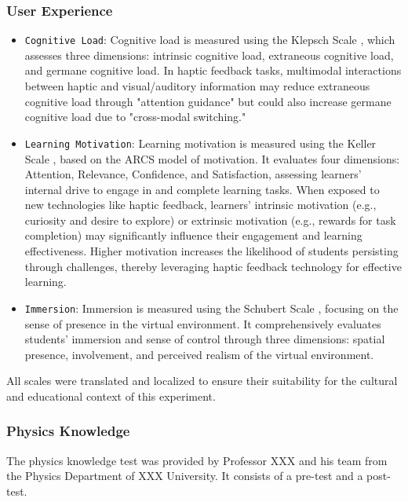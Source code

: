\documentclass[runningheads]{llncs}
\begin{document}
\subsubsection{User Experience}
\begin{itemize}
  \item {\texttt{Cognitive Load}}: Cognitive load is measured using the Klepsch Scale \cite{klepsch2017development}, which assesses three dimensions: intrinsic cognitive load, extraneous cognitive load, and germane cognitive load. In haptic feedback tasks, multimodal interactions between haptic and visual/auditory information may reduce extraneous cognitive load through "attention guidance" but could also increase germane cognitive load due to "cross-modal switching."

  \item {\texttt{Learning Motivation}}: Learning motivation is measured using the Keller Scale \cite{keller1983motivational}, based on the ARCS model of motivation. It evaluates four dimensions: Attention, Relevance, Confidence, and Satisfaction, assessing learners' internal drive to engage in and complete learning tasks. When exposed to new technologies like haptic feedback, learners' intrinsic motivation (e.g., curiosity and desire to explore) or extrinsic motivation (e.g., rewards for task completion) may significantly influence their engagement and learning effectiveness. Higher motivation increases the likelihood of students persisting through challenges, thereby leveraging haptic feedback technology for effective learning.

  \item {\texttt{Immersion}}: Immersion is measured using the Schubert Scale \cite{schubert2001experience}, focusing on the sense of presence in the virtual environment. It comprehensively evaluates students' immersion and sense of control through three dimensions: spatial presence, involvement, and perceived realism of the virtual environment.
\end{itemize}

All scales were translated and localized to ensure their suitability for the cultural and educational context of this experiment.

\subsubsection{Physics Knowledge}
The physics knowledge test was provided by Professor XXX
and his team from the Physics Department of XXX
University. It consists of a pre-test and a post-test.
\end{document}
